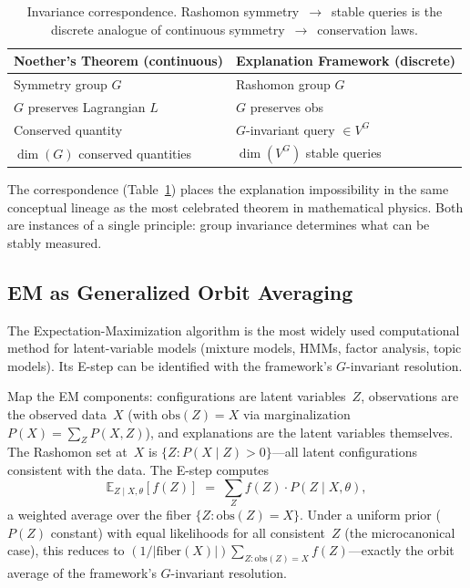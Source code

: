 \documentclass[11pt,a4paper]{article}
\newcommand{\E}{\mathbb{E}}
\begin{document}
\begin{table}[t]
  \centering
  \small
  \begin{tabular}{@{}ll@{}}
    \toprule
    \textbf{Noether's Theorem (continuous)} & \textbf{Explanation Framework (discrete)} \\
    \midrule
    Symmetry group $G$ & Rashomon group $G$ \\
    $G$ preserves Lagrangian $L$ & $G$ preserves obs \\
    Conserved quantity & $G$-invariant query $\in V^G$ \\
    $\dim(G)$ conserved quantities & $\dim(V^G)$ stable queries \\
    \bottomrule
  \end{tabular}
  \caption{Invariance correspondence.  Rashomon symmetry~$\to$~stable queries
    is the discrete analogue of continuous symmetry~$\to$~conservation laws.}
  \label{tab:noether-dictionary}
\end{table}

The correspondence (Table~\ref{tab:noether-dictionary}) places the explanation
impossibility in the same conceptual lineage as the most celebrated theorem in
mathematical physics.  Both are instances of a single principle: group
invariance determines what can be stably measured.

\subsection{EM as Generalized Orbit Averaging}
\label{sec:bridge-em}

The Expectation-Maximization algorithm \citep{dempster1977maximum} is the most
widely used computational method for latent-variable models (mixture models,
HMMs, factor analysis, topic models).  Its E-step can be identified with the
framework's $G$-invariant resolution.

Map the EM components: configurations are latent variables~$Z$, observations
are the observed data~$X$ (with $\mathrm{obs}(Z) = X$ via marginalization
$P(X) = \sum_Z P(X,Z)$), and explanations are the latent variables
themselves.  The Rashomon set at~$X$ is $\{Z : P(X \mid Z) > 0\}$---all
latent configurations consistent with the data.  The E-step computes
\[
  \E_{Z \mid X, \theta}[f(Z)]
  \;=\; \sum_Z f(Z) \cdot P(Z \mid X, \theta),
\]
a weighted average over the fiber $\{Z : \mathrm{obs}(Z) = X\}$.  Under a
uniform prior ($P(Z)$ constant) with equal likelihoods for all consistent~$Z$
(the microcanonical case), this reduces to $(1/|\mathrm{fiber}(X)|) \sum_{Z :
\mathrm{obs}(Z) = X} f(Z)$---exactly the orbit average of the framework's
$G$-invariant resolution.
\end{document}
